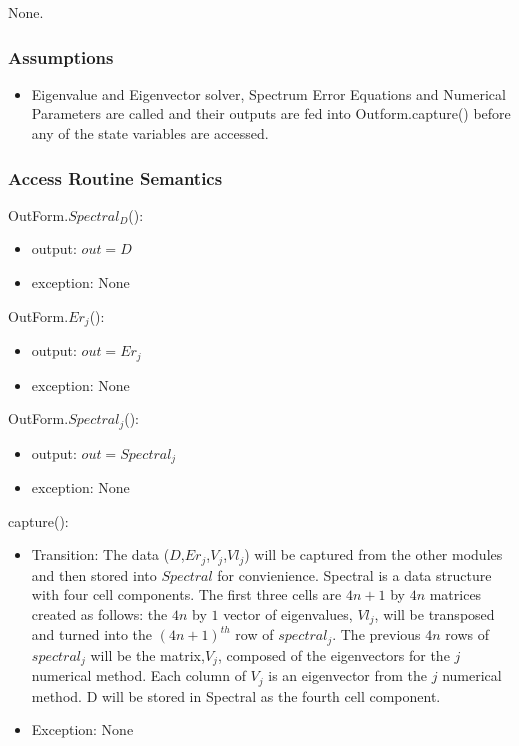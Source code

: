 \documentclass[12pt, titlepage]{article}
\begin{document}
None.

\subsubsection{Assumptions}

\begin{itemize}
	\item Eigenvalue and Eigenvector solver, Spectrum Error Equations and 
	Numerical Parameters 
	are called and their outputs are fed into Outform.capture() 
	before any of the state variables are accessed. 
\end{itemize}

\subsubsection{Access Routine Semantics}

\noindent OutForm.$Spectral_{D}$():
\begin{itemize}
	\item output: $out = D$
	\item exception: None
\end{itemize}

\noindent OutForm.$Er_{j}$():
\begin{itemize}
	\item output: $out = Er_{j}$
	\item exception: None
\end{itemize} 

\noindent OutForm.$Spectral_{j}$():
\begin{itemize}
	\item output: $out = Spectral_{j}$
	\item exception: None
\end{itemize}

\noindent capture():
\begin{itemize}
	\item Transition: The data ($D$,$Er_{j}$,$V_{j}$,$Vl_{j}$) will be 
	captured from the other 
	modules and then stored into $Spectral$ for convienience. Spectral is a 
	data 
	structure with four cell components. The first three cells are
	$4n+1$ by $4n$ matrices created as follows: the $4n$ by $1$ vector of 
	eigenvalues, $Vl_j$, will be transposed and turned into the $(4n+1)^{th}$ 
	row 
	of 
	$spectral_{j}$. The previous $4n$ rows of $spectral_{j}$ will be the 
	matrix,$ 
	V_j$, 
	composed 
	of the eigenvectors for the $j$ numerical method. Each column of $V_j$ is 
	an eigenvector from the $j$ numerical method. D will be stored in Spectral 
	as the fourth 
	cell component.  
	\item Exception: None
\end{itemize}  
\end{document}
